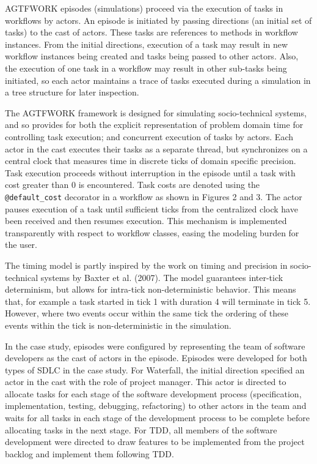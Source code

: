 \documentclass{llncs}
\begin{document}
AGTFWORK episodes (simulations) proceed via the execution of tasks in workflows by actors.  An episode is initiated by
passing directions (an initial set of tasks) to the cast of actors.  These tasks are references to methods in workflow
instances.  From the initial directions, execution of a task may result in new workflow instances being created and
tasks being passed to other actors.  Also, the execution of one task in a workflow may result in other sub-tasks being
initiated, so each actor maintains a trace of tasks executed during a simulation in a tree structure for later
inspection.

The AGTFWORK framework is designed for simulating socio-technical systems, and so provides for both the explicit
representation of problem domain time for controlling task execution; and concurrent execution of tasks by actors.  Each
actor in the cast executes their tasks as a separate thread, but synchronizes on a central clock that measures time in
discrete ticks of domain specific precision.  Task execution proceeds without interruption in the episode until a task
with cost greater than 0 is encountered.  Task costs are denoted using the \lstinline!@default_cost! decorator in a
workflow as shown in Figures 2 and 3.  The actor pauses execution of a task until sufficient ticks from the centralized
clock have been received and then resumes execution.  This mechanism is implemented transparently with respect to
workflow classes, easing the modeling burden for the user.

The timing model is partly inspired by the work on timing and precision in socio-technical systems by Baxter et
al. (2007).  The model guarantees inter-tick determinism, but allows for intra-tick non-deterministic behavior.  This
means that, for example a task started in tick 1 with duration 4 will terminate in tick 5.  However, where two events
occur within the same tick the ordering of these events within the tick is non-deterministic in the simulation.

In the case study, episodes were configured by representing the team of software developers as the cast of actors in the
episode.  Episodes were developed for both types of SDLC in the case study.  For Waterfall, the initial direction
specified an actor in the cast with the role of project manager.  This actor is directed to allocate tasks for each
stage of the software development process (specification, implementation, testing, debugging, refactoring) to other
actors in the team and waits for all tasks in each stage of the development process to be complete before allocating
tasks in the next stage.  For TDD, all members of the software development were directed to draw features to be
implemented from the project backlog and implement them following TDD.
\end{document}
